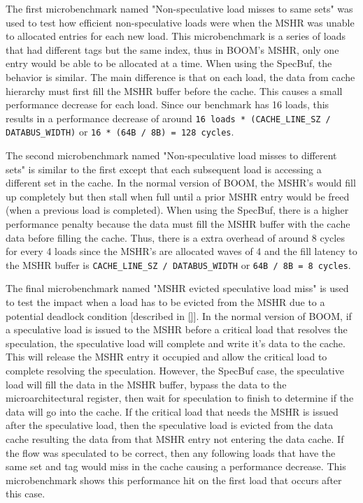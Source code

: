 The first microbenchmark named "Non-speculative load misses to same sets" was used to test how efficient non-speculative loads
were when the MSHR was unable to allocated entries for each new load. This microbenchmark is a series of loads that had different
tags but the same index, thus in BOOM's MSHR, only one entry would be able to be allocated at a time. When using the SpecBuf, the 
behavior is similar. The main difference is that on each load, the data from cache hierarchy must first fill the MSHR buffer
before the cache. This causes a small performance decrease for each load. Since our benchmark has 16 loads, this results in a performance decrease of around
{\tt 16 loads * (CACHE\_LINE\_SZ / DATABUS\_WIDTH)} or {\tt 16 * (64B / 8B) = 128 cycles}.

The second microbenchmark named "Non-speculative load misses to different sets" is similar to the first except that each subsequent
load is accessing a different set in the cache. In the normal version of BOOM, the MSHR's would fill up completely but then stall 
when full until a prior MSHR entry would be freed (when a previous load is completed). When using the SpecBuf, there is a
higher performance penalty because the data must fill the MSHR buffer with the cache data before filling the cache. Thus, there 
is a extra overhead of around 8 cycles for every 4 loads since the MSHR's are allocated waves of 4 and the fill latency to the MSHR
buffer is {\tt CACHE\_LINE\_SZ / DATABUS\_WIDTH} or {\tt 64B / 8B = 8 cycles}.

The final microbenchmark named "MSHR evicted speculative load miss" is used to test the impact when a load has to be evicted from the 
MSHR due to a potential deadlock condition [described in \ref{}]. In the normal version of BOOM, if a speculative load is issued to the 
MSHR before a critical load that resolves the speculation, the speculative load will complete and
write it's data to the cache. This will release the MSHR entry it occupied and allow the critical load to complete resolving the speculation. 
However, the SpecBuf case, the speculative load will fill the data in the MSHR buffer, bypass the data to the microarchitectural register, 
then wait for speculation to finish to determine if the data will go into the cache. If the critical load that needs the MSHR is issued after the speculative load,
then the speculative load is evicted from the data cache resulting the data from that MSHR entry not entering the data cache. If the 
flow was speculated to be correct, then any following loads that have the same set and tag would miss in the cache causing a performance decrease.
This microbenchmark shows this performance hit on the first load that occurs after this case.

